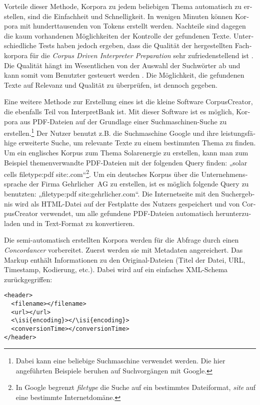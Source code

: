 \documentclass[output=paper]{LSP/langsci}
\begin{document}
\begin{otherlanguage}{ngerman}
Vorteile dieser Methode, Korpora zu jedem beliebigen Thema automatisch zu erstellen, sind die Einfachheit und Schnelligkeit. In wenigen Minuten können Korpora mit hunderttausenden von Tokens erstellt werden. Nachteile sind dagegen die kaum vorhandenen Möglichkeiten der Kontrolle der gefundenen Texte. Unterschiedliche Tests haben jedoch ergeben, dass die Qualität der hergestellten Fachkorpora für die \textit{Corpus Driven Interpreter Preparation} sehr zufriedenstellend ist \citep{Fantinuoli2006}. Die Qualität hängt im Wesentlichen von der Auswahl der Suchwörter ab und kann somit vom Benutzter gesteuert werden \citep{Ueyama2006}. Die Möglichkeit, die gefundenen Texte auf Relevanz und Qualität zu überprüfen, ist dennoch gegeben.

Eine weitere Methode zur Erstellung eines  ist die kleine Software CorpusCreator, die ebenfalls Teil von InterpretBank ist. Mit dieser Software ist es möglich, Korpora aus PDF-Dateien auf der Grundlage einer Suchmaschinen-Suche zu erstellen.\footnote{Dabei kann eine beliebige Suchmaschine verwendet werden. Die hier angeführten Beispiele beruhen auf Suchvorgängen mit Google.} Der Nutzer benutzt z.B. die Suchmaschine Google und ihre leistungsfähige erweiterte Suche, um relevante Texte zu einem bestimmten Thema zu finden. Um ein englisches Korpus zum Thema Solarenergie zu erstellen, kann man zum Beispiel themenverwandte PDF-Dateien mit der folgenden Query finden: „solar cells filetype:pdf site:.com“\footnote{In Google begrenzt \textit{filetype} die Suche auf ein bestimmtes Dateiformat, \textit{site} auf eine bestimmte Internetdomäne.}. Um ein deutsches Korpus über die Unternehmenssprache der Firma Gehrlicher~AG zu erstellen, ist es möglich folgende Query zu benutzten: „filetype:pdf site:gehrlicher.com“. Die Internetseite mit den Suchergebnis wird als HTML-Datei auf der Festplatte des Nutzers gespeichert und von CorpusCreator verwendet, um alle gefundene PDF-Dateien automatisch herunterzuladen und in Text-Format zu konvertieren.
 
Die semi-automatisch erstellten Korpora werden für die Abfrage durch einen \textit{Concordancer} vorbereitet. Zuerst werden sie mit Metadaten angereichert. Das Markup enthält Informationen zu den Original-Dateien (Titel der Datei, URL, Timestamp, Kodierung, etc.). Dabei wird auf ein einfaches XML-Schema zurückgegriffen:

\ea
\begin{lstlisting}
<header>
  <filename></filename>
  <url></url>
  <\isi{encoding}></\isi{encoding}>
  <conversionTime></conversionTime>
</header>
\end{lstlisting}
\z


\end{otherlanguage}
\end{document}
